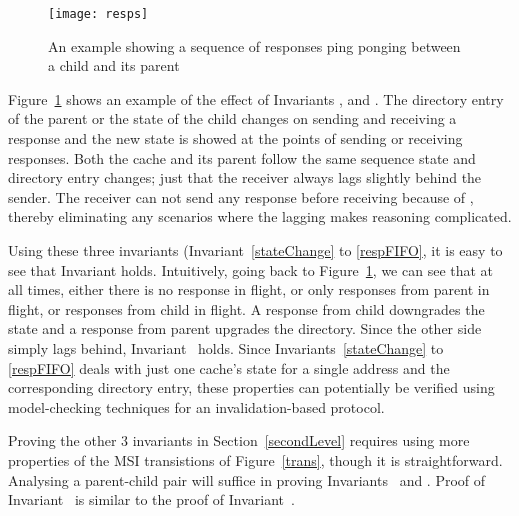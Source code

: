\begin{figure}
\centering
\texttt{[image: resps]}
\caption{An example showing a sequence of responses ping ponging between a child and its parent}
\label{resps}
\end{figure}

Figure~\ref{resps} shows an example of the effect of Invariants
,  and . The directory
entry of the parent or the state of the child changes on sending and receiving
a response and the new state is showed at the points of sending or receiving
responses.
Both the cache and its parent follow the same sequence state and directory
entry changes; just that the receiver always lags slightly behind the sender.
The receiver can not send any response before receiving because of
, thereby eliminating any scenarios where the lagging makes
reasoning complicated.

Using these three invariants (Invariant~\ref{stateChange} to \ref{respFIFO}, it
is easy to see that Invariant  holds. Intuitively, going
back to Figure~\ref{resps}, we can see that at all times, either there is no
response in flight, or only responses from parent in flight, or responses from
child in flight. A response from child downgrades the state and a response from
parent upgrades the directory. Since the other side simply lags behind,
Invariant~ holds. Since Invariants~\ref{stateChange} to
\ref{respFIFO} deals with just one cache's state for a single address and the
corresponding directory entry, these properties can potentially be verified
using model-checking techniques for an invalidation-based protocol.

Proving the other 3 invariants in Section~\ref{secondLevel} requires
using more properties of the MSI transistions of Figure~\ref{trans},
though it is straightforward. Analysing a parent-child pair will
suffice in proving Invariants~ and
. Proof of
Invariant~ is similar to the proof of
Invariant~.

